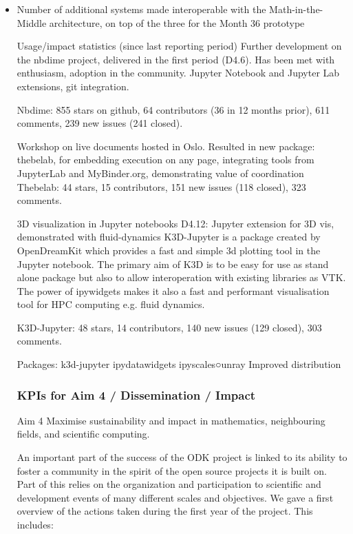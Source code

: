 \begin{Aim 1}
\begin{Aim 2}
\begin{itemize}
\item Number of additional systems made interoperable with the Math-in-the-Middle architecture, on top of the three for the Month
  36 prototype



Usage/impact statistics (since last reporting period)
Further development on the nbdime project, delivered in the first period (D4.6). Has been met with enthusiasm, adoption in the community.
Jupyter Notebook and Jupyter Lab extensions, git integration.

Nbdime: 855 stars on github, 64 contributors (36 in 12 months prior), 611 
comments, 239 new issues (241 closed).

Workshop on live documents hosted in Oslo. Resulted in new package: thebelab, for embedding execution on any page, integrating tools from 
JupyterLab and MyBinder.org, demonstrating value of coordination
Thebelab: 44 stars, 15 contributors, 151 new issues (118 closed), 323 
comments.

3D visualization in Jupyter notebooks D4.12: Jupyter extension for 3D vis, demonstrated with fluid-dynamics
K3D-Jupyter is a package created by OpenDreamKit which provides a fast and simple 3d plotting tool in the Jupyter notebook. The primary aim 
of K3D is to be easy for use as stand alone package but also to allow interoperation with existing libraries as VTK. The power of ipywidgets 
makes it also a fast and performant visualisation tool for HPC computing e.g. fluid dynamics.

K3D-Jupyter: 48 stars, 14 contributors, 140 new issues (129 closed), 303 
comments.

Packages:
k3d-jupyter
ipydatawidgets
ipyscales○unray
Improved distribution

\subsubsection{KPIs for Aim 4 / Dissemination / Impact}

\begin{recommendation}{Aim 4}
  Maximise sustainability and impact in mathematics, neighbouring fields, and scientific computing.\end{recommendation}


An important part of the success of the ODK project is linked to its ability to foster a community in the spirit of the open source projects 
it is built on. Part of this relies on the organization and participation to scientific and development events of many different scales and 
objectives. We gave a first overview of the actions taken during the first year of the project. This includes:


\end{itemize}
\end{Aim 2}
\end{Aim 1}
